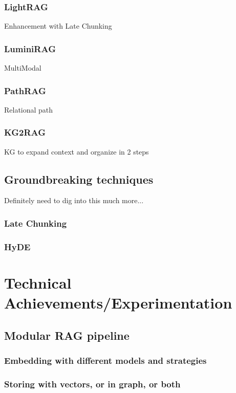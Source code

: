 \documentclass[12pt,twoside]{report}
\begin{document}
\subsection{LightRAG}
Enhancement with Late Chunking

\subsection{LuminiRAG}
MultiModal

\subsection{PathRAG}
Relational path

\subsection{KG2RAG}
KG to expand context and organize in 2 steps

\section{Groundbreaking techniques}

Definitely need to dig into this much more...

\subsection{Late Chunking}

\subsection{HyDE}


\chapter{Technical Achievements/Experimentation}

\section{Modular RAG pipeline}

\subsection{Embedding with different models and strategies}

\subsection{Storing with vectors, or in graph, or both}
\end{document}
